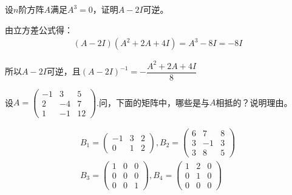 \documentclass[a4paper]{report}
\begin{document}
\EX 设$n$阶方阵$A$满足$A^3=0$，证明$A-2I$可逆。

\begin{zhengming}
由立方差公式得：
\begin{align*}
(A-2I)(A^2+2A+4I)=A^3-8I=-8I
\end{align*}

所以$A-2I$可逆，且$(A-2I)^{-1}=-\dfrac{A^2+2A+4I}{8}$
\end{zhengming}

\EX 设$A=
\begin{pmatrix}
-1&3&5\\
2&-4&7\\
1&-1&12
\end{pmatrix}
$.问，下面的矩阵中，哪些是与$A$相抵的？说明理由。

\begin{gather*}
B_1=
\begin{pmatrix}
-1&3&2\\ 0&1&2
\end{pmatrix},B_2=
\begin{pmatrix}
6&7&8\\
3&-1&3\\
3&8&5
\end{pmatrix}\\
B_3=
\begin{pmatrix}
1&0&0\\ 0&0&0\\ 0&0&1
\end{pmatrix},B_4=
\begin{pmatrix}
1&2&0\\
0&1&0\\
0&0&0
\end{pmatrix}
\end{gather*}
\end{document}
